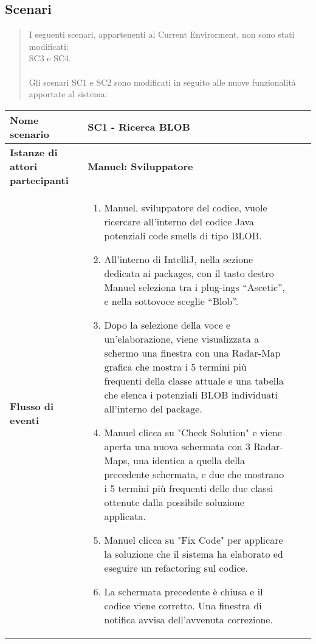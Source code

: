 	
\subsection{Scenari}
\begin{quote}
	I seguenti scenari, appartenenti al Current Envirorment, non sono stati modificati:\\
	SC3 e SC4.	\\ \\	
	Gli scenari SC1 e SC2 sono modificati in seguito alle nuove funzionalità apportate al sistema:
\end{quote}

 \begin{tabular}{|l|p{8cm}|p{1cm}|p{1.1cm}|}
	\hline
	\textbf{Nome scenario}  & \textbf{SC1 - Ricerca BLOB} \\ \hline
	\textbf{Istanze di attori partecipanti}  & \textbf{Manuel: Sviluppatore} \\ \hline
	\textbf{Flusso di eventi}  & \begin{enumerate}
		\item  Manuel, sviluppatore del codice, vuole ricercare all’interno del codice Java potenziali code smells di tipo BLOB. 
		\item  All’interno di IntelliJ, nella sezione dedicata ai packages, con il tasto destro Manuel seleziona tra i plug-ings “Ascetic”, e nella sottovoce sceglie “Blob”. 
		\item Dopo la selezione della voce e un'elaborazione, viene visualizzata a schermo una finestra con una Radar-Map grafica che mostra i 5 termini più frequenti della classe attuale e una tabella che elenca i potenziali BLOB individuati all'interno del package. 
		\item Manuel clicca su "Check Solution" e viene aperta una nuova schermata con 3 Radar-Maps, una identica a quella della precedente schermata, e due che mostrano i 5 termini più frequenti delle due classi ottenute dalla possibile soluzione applicata.
		\item Manuel clicca su "Fix Code" per applicare la soluzione che il sistema ha elaborato ed eseguire un refactoring sul codice. 
		\item La schermata precedente è chiusa e il codice viene corretto. Una finestra di notifica avvisa dell'avvenuta correzione.
		\end{enumerate} \\ \hline
\end{tabular}
\newpage

